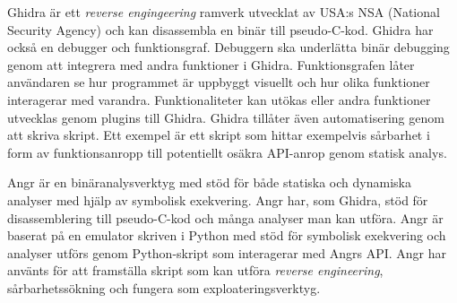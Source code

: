 

Ghidra är ett \emph{reverse engingeering} ramverk utvecklat av USA:s NSA
(National Security Agency) och kan disassembla en binär till pseudo-C-kod.
Ghidra har också en debugger och funktionsgraf. Debuggern ska underlätta binär
debugging genom att integrera med andra funktioner i Ghidra. Funktionsgrafen
låter användaren se hur programmet är uppbyggt visuellt och hur olika
funktioner interagerar med varandra. Funktionaliteter kan utökas eller andra
funktioner utvecklas genom plugins till Ghidra\cite{ghidra_use_cases}. Ghidra
tillåter även automatisering genom att skriva skript. Ett exempel är ett skript
som hittar exempelvis sårbarhet i form av funktionsanropp till potentiellt
osäkra API-anrop genom statisk analys\cite{ghidra_script}.

Angr är en binäranalysverktyg med stöd för både statiska och dynamiska analyser
med hjälp av symbolisk exekvering. Angr har, som Ghidra, stöd för
disassemblering till pseudo-C-kod och många analyser man kan utföra. Angr är
baserat på en emulator skriven i Python med stöd för symbolisk exekvering och
analyser utförs genom Python-skript som interagerar med Angrs API. Angr har
använts för att framställa skript som kan utföra \emph{reverse engineering},
sårbarhetssökning och fungera som exploateringsverktyg\cite{angr_docs}.
